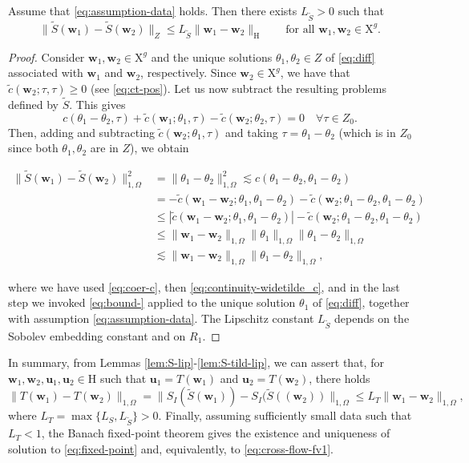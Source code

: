 \documentclass[onefignum,onetabnum,reqno,a4paper,final]{siamart250211}
\newcommand\bu{\boldsymbol{u}}
\newcommand\bw{\boldsymbol{w}}
\newcommand\0{\mathbf{0}}
\newcommand\bH{\boldsymbol{\mathrm{H}}}
\newcommand\bX{\boldsymbol{\mathrm{X}}}
\numberwithin{figure}{section}
\numberwithin{table}{section}
\begin{document}
	
	\begin{lemma}\label{lem:S-tild-lip}
		Assume that \eqref{eq:assumption-data} holds. Then there exists $L_{\tilde{S}}>0$ such that 
		\[\| \tilde{S}(\bw_1)-\tilde{S}(\bw_2)\|_{Z} \leq L_{\tilde{S}} \|\bw_1 - \bw_2\|_{\bH} \qquad 
		\text{for all $\bw_1,\bw_2\in \bX^g$}.\] 
	\end{lemma}
	\begin{proof}
		Consider $\bw_1,\bw_2\in \bX^g$ and the unique solutions $\theta_1,\theta_2\in Z$ of \eqref{eq:diff} associated with $\bw_1$ and $\bw_2$, respectively. Since 
		$\bw_2\in \bX^g$, we have that $\widetilde{c}(\bw_2; \tau, \tau) \geq 0$ (see \eqref{eq:ct-pos}). Let us now 
		subtract the resulting problems defined by $\tilde{S}$. This gives  
		\[c(\theta_1-\theta_2,\tau)  + \widetilde{c}(\bw_1; \theta_1, \tau) - \widetilde{c}(\bw_2; \theta_2, \tau) = 0 \quad \forall \tau \in Z_0. \]
		Then, adding and subtracting $\widetilde{c}(\bw_2; \theta_1, \tau)$ and taking $\tau=\theta_1-\theta_2$ (which is in $Z_0$ since both $\theta_1,\theta_2$ are in $Z$), we obtain 
		\begin{linenomath}
			\begin{align*}
				\|\tilde{S}(\bw_1)-\tilde{S}(\bw_2)\|^2_{1,\Omega}& = \|\theta_1-\theta_2\|^2_{1,\Omega} \lesssim c(\theta_1-\theta_2, \theta_1-\theta_2)\\
				& =  - \widetilde{c}(\bw_1-\bw_2; \theta_1, \theta_1 - \theta_2) -\widetilde{c}(\bw_2; \theta_1-\theta_2, \theta_1-\theta_2)\\
				&\leq |  \widetilde{c}(\bw_1-\bw_2; \theta_1, \theta_1-\theta_2)| - \widetilde{c}(\bw_2; \theta_1-\theta_2, \theta_1-\theta_2) \\
				& \leq \|\bw_1-\bw_2\|_{1,\Omega}\|\theta_1\|_{1,\Omega}\|\theta_1-\theta_2\|_{1,\Omega}\\
				& \lesssim  \|\bw_1-\bw_2\|_{1,\Omega}\|\theta_1-\theta_2\|_{1,\Omega},
			\end{align*}
		\end{linenomath}
		where we have used \eqref{eq:coer-c}, then \eqref{eq:continuity-widetilde_c}, and in the last step we invoked \eqref{eq:bound-} applied to the unique solution $\theta_1$ of \eqref{eq:diff}, together with  assumption \eqref{eq:assumption-data}. The Lipschitz constant $L_{\tilde{S}}$ depends on the Sobolev embedding  constant and on $R_1$. 
	\end{proof}
	
	In summary, from Lemmas \ref{lem:S-lip}-\ref{lem:S-tild-lip}, we can assert that, for $\bw_1,\bw_2,\bu_1,\bu_2\in \bH$ such that $\bu_1 = T(\bw_1)$ and $\bu_2 = T(\bw_2)$, there holds  
	\[ \|T(\bw_1) - T(\bw_2)\|_{1,\Omega} = \| S_I(\tilde{S}(\bw_1)) - S_I(\tilde{S}((\bw_2)) \|_{1,\Omega} \leq L_T \|\bw_1-\bw_2\|_{1,\Omega}, \]
	where $L_T  = \max\{ L_S,  L_{\tilde{S}}\} >0$. Finally, assuming sufficiently small data such that $L_T <1$,  the Banach fixed-point theorem gives the existence and uniqueness of solution to \eqref{eq:fixed-point} and, equivalently, to \eqref{eq:cross-flow-fv1}. 
	
\end{document}
